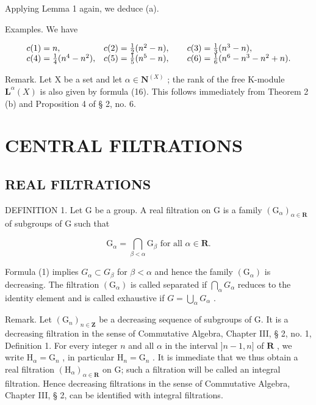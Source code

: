 Applying Lemma 1 again, we deduce (a).

Examples. We have

\[
\begin{array}{l l} c (1) = n, & c (2) = \frac {1}{2} (n ^ {2} - n), \qquad c (3) = \frac {1}{3} (n ^ {3} - n), \\ c (4) = \frac {1}{4} (n ^ {4} - n ^ {2}), & c (5) = \frac {1}{5} (n ^ {5} - n), \qquad c (6) = \frac {1}{6} (n ^ {6} - n ^ {3} - n ^ {2} + n). \end{array}
\]

Remark. Let X be a set and let \(\alpha \in \mathbf{N}^{(X)}\) ; the rank of the free K-module \(\mathbf{L}^{\alpha}(X)\) is also given by formula (16). This follows immediately from Theorem 2 (b) and Proposition 4 of § 2, no. 6.

\section{CENTRAL FILTRATIONS}

\subsection{REAL FILTRATIONS}

DEFINITION 1. Let G be a group. A real filtration on G is a family \((\mathrm{G}_{\alpha})_{\alpha \in \mathbf{R}}\) of subgroups of G such that

\[
\mathrm{G} _ {\alpha} = \bigcap_ {\beta <   \alpha} \mathrm{G} _ {\beta} \text {   for   all   } \alpha \in \mathbf {R}.\tag{1}
\]

Formula (1) implies \(G_{\alpha} \subset G_{\beta}\) for \(\beta < \alpha\) and hence the family \((\mathrm{G}_{\alpha})\) is decreasing. The filtration \((\mathrm{G}_{\alpha})\) is called separated if \(\bigcap_{\alpha} G_{\alpha}\) reduces to the identity element and is called exhaustive if \(G = \bigcup_{\alpha} G_{\alpha}\) .

Remark. Let \((\mathrm{G}_n)_{n\in \mathbf{Z}}\) be a decreasing sequence of subgroups of G. It is a decreasing filtration in the sense of Commutative Algebra, Chapter III, § 2, no. 1, Definition 1. For every integer \(n\) and all \(\alpha\) in the interval \(]n - 1,n]\) of \(\mathbf{R}\) , we write \(\mathrm{H}_{\alpha} = \mathrm{G}_{n}\) , in particular \(\mathrm{H}_n = \mathrm{G}_n\) . It is immediate that we thus obtain a real filtration \((\mathrm{H}_{\alpha})_{\alpha \in \mathbf{R}}\) on G; such a filtration will be called an integral filtration. Hence decreasing filtrations in the sense of Commutative Algebra, Chapter III, § 2, can be identified with integral filtrations.

